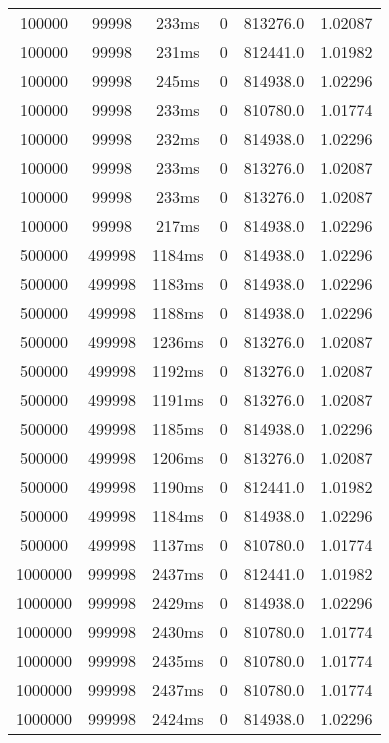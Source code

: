 \documentclass[./main.tex]{subfiles}
\begin{document}
\begin{table}
\begin{tabular}{ c | c | c | c | c | c }
        \rowcolor{lightgray} 100000 & 99998 & 233ms & 0 & 813276.0 & 1.02087 \\
        100000 & 99998 & 231ms & 0 & 812441.0 & 1.01982 \\
        100000 & 99998 & 245ms & 0 & 814938.0 & 1.02296 \\
        100000 & 99998 & 233ms & 0 & 810780.0 & 1.01774 \\
        100000 & 99998 & 232ms & 0 & 814938.0 & 1.02296 \\
        \rowcolor{lightgray} 100000 & 99998 & 233ms & 0 & 813276.0 & 1.02087 \\
        \rowcolor{lightgray} 100000 & 99998 & 233ms & 0 & 813276.0 & 1.02087 \\
        100000 & 99998 & 217ms & 0 & 814938.0 & 1.02296 \\
        \hline
        500000 & 499998 & 1184ms & 0 & 814938.0 & 1.02296 \\
        500000 & 499998 & 1183ms & 0 & 814938.0 & 1.02296 \\
        500000 & 499998 & 1188ms & 0 & 814938.0 & 1.02296 \\
        \rowcolor{lightgray} 500000 & 499998 & 1236ms & 0 & 813276.0 & 1.02087 \\
        \rowcolor{lightgray} 500000 & 499998 & 1192ms & 0 & 813276.0 & 1.02087 \\
        \rowcolor{lightgray} 500000 & 499998 & 1191ms & 0 & 813276.0 & 1.02087 \\
        500000 & 499998 & 1185ms & 0 & 814938.0 & 1.02296 \\
        \rowcolor{lightgray} 500000 & 499998 & 1206ms & 0 & 813276.0 & 1.02087 \\
        500000 & 499998 & 1190ms & 0 & 812441.0 & 1.01982 \\
        500000 & 499998 & 1184ms & 0 & 814938.0 & 1.02296 \\
        500000 & 499998 & 1137ms & 0 & 810780.0 & 1.01774 \\
        \hline
        1000000 & 999998 & 2437ms & 0 & 812441.0 & 1.01982 \\
        1000000 & 999998 & 2429ms & 0 & 814938.0 & 1.02296 \\
        1000000 & 999998 & 2430ms & 0 & 810780.0 & 1.01774 \\
        1000000 & 999998 & 2435ms & 0 & 810780.0 & 1.01774 \\
        1000000 & 999998 & 2437ms & 0 & 810780.0 & 1.01774 \\
        1000000 & 999998 & 2424ms & 0 & 814938.0 & 1.02296 \\

\end{tabular}
\end{table}
\end{document}

